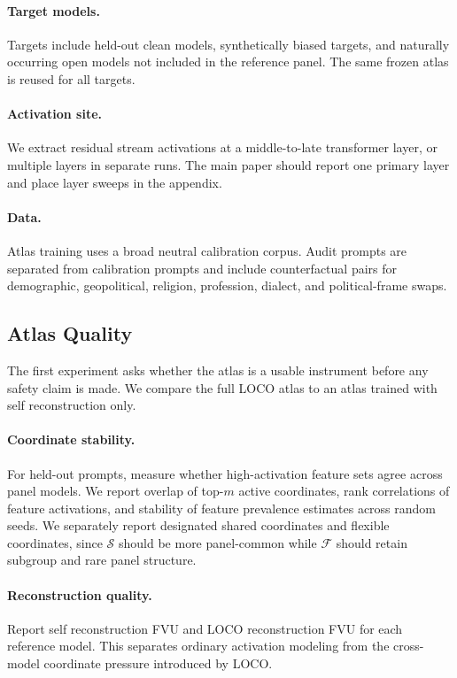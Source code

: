 \documentclass[11pt]{article}
\newcommand{\shared}{\mathcal{S}}
\newcommand{\flex}{\mathcal{F}}
\begin{document}
\paragraph{Target models.}
Targets include held-out clean models, synthetically biased targets, and naturally occurring open models not included in the reference panel. The same frozen atlas is reused for all targets.

\paragraph{Activation site.}
We extract residual stream activations at a middle-to-late transformer layer, or multiple layers in separate runs. The main paper should report one primary layer and place layer sweeps in the appendix.

\paragraph{Data.}
Atlas training uses a broad neutral calibration corpus. Audit prompts are separated from calibration prompts and include counterfactual pairs for demographic, geopolitical, religion, profession, dialect, and political-frame swaps.

\subsection{Atlas Quality}

The first experiment asks whether the atlas is a usable instrument before any safety claim is made. We compare the full LOCO atlas to an atlas trained with self reconstruction only.

\paragraph{Coordinate stability.}
For held-out prompts, measure whether high-activation feature sets agree across panel models. We report overlap of top-$m$ active coordinates, rank correlations of feature activations, and stability of feature prevalence estimates across random seeds. We separately report designated shared coordinates and flexible coordinates, since $\shared$ should be more panel-common while $\flex$ should retain subgroup and rare panel structure.

\paragraph{Reconstruction quality.}
Report self reconstruction FVU and LOCO reconstruction FVU for each reference model. This separates ordinary activation modeling from the cross-model coordinate pressure introduced by LOCO.
\end{document}
